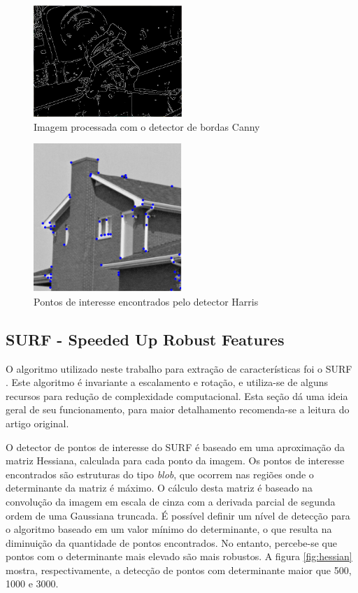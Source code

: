 \documentclass[a4paper]{coursepaper-br}
\begin{document}
\begin{figure}
\centering
\includegraphics[width=0.5\textwidth]{Valve_monochrome_canny_(6).PNG}
\caption{Imagem processada com o detector de bordas Canny}
\label{fig:canny}
\end{figure}

\begin{figure}
\centering
\includegraphics[width=0.5\textwidth]{HarrisHouseTest.png}
\caption{Pontos de interesse encontrados pelo detector Harris}
\label{fig:harris}
\end{figure}

\subsection{SURF - Speeded Up Robust Features}

O algoritmo utilizado neste trabalho para extração de características
foi o SURF \cite{Bay2008}. Este algoritmo é invariante a escalamento e
rotação, e utiliza-se de alguns recursos para redução de complexidade
computacional. Esta seção dá uma ideia geral de seu funcionamento,
para maior detalhamento recomenda-se a leitura do artigo original.

O detector de pontos de interesse do SURF é baseado em uma aproximação
da matriz Hessiana, calculada para cada ponto da imagem. Os pontos de
interesse encontrados são estruturas do tipo \emph{blob}, que ocorrem
nas regiões onde o determinante da matriz é máximo. O cálculo desta
matriz é baseado na convolução da imagem em escala de cinza com a
derivada parcial de segunda ordem de uma Gaussiana truncada. É
possível definir um nível de detecção para o algoritmo baseado em um
valor mínimo do determinante, o que resulta na diminuição da
quantidade de pontos encontrados. No entanto, percebe-se que pontos
com o determinante mais elevado são mais robustos. A figura
\ref{fig:hessian} mostra, respectivamente, a detecção de pontos com
determinante maior que 500, 1000 e 3000.
\end{document}
